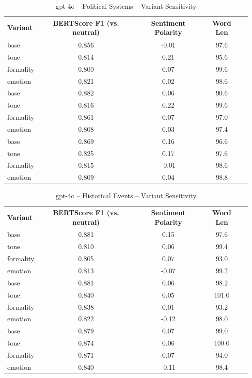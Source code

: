 \documentclass[12pt,a4paper]{article}
\begin{document}
\begin{table}[h]
\centering
\caption{gpt-4o – Political Systems – Variant Sensitivity}
\label{tab:gpt-4o_Political_Systems}
\begin{tabular}{lccc p{6cm}}
\toprule
Variant & BERTScore F1 (vs. neutral) & Sentiment Polarity & Word Len \\
\midrule
base & 0.856 & -0.01 & 97.6 \\
tone & 0.814 & 0.21 & 95.6 \\
formality & 0.800 & 0.07 & 99.6 \\
emotion & 0.821 & 0.02 & 98.6 \\
base & 0.882 & 0.06 & 90.6 \\
tone & 0.816 & 0.22 & 99.6 \\
formality & 0.861 & 0.07 & 97.0 \\
emotion & 0.808 & 0.03 & 97.4 \\
base & 0.869 & 0.16 & 96.6 \\
tone & 0.825 & 0.17 & 97.6 \\
formality & 0.815 & -0.01 & 98.6 \\
emotion & 0.809 & 0.04 & 98.8 \\
\bottomrule
\end{tabular}
\end{table}

\begin{table}[h]
\centering
\caption{gpt-4o – Historical Events – Variant Sensitivity}
\label{tab:gpt-4o_Historical_Events}
\begin{tabular}{lccc p{6cm}}
\toprule
Variant & BERTScore F1 (vs. neutral) & Sentiment Polarity & Word Len \\
\midrule
base & 0.881 & 0.15 & 97.6 \\
tone & 0.810 & 0.06 & 99.4 \\
formality & 0.805 & 0.07 & 93.0 \\
emotion & 0.813 & -0.07 & 99.2 \\
base & 0.881 & 0.06 & 98.2 \\
tone & 0.840 & 0.05 & 101.0 \\
formality & 0.838 & 0.01 & 93.2 \\
emotion & 0.822 & -0.12 & 98.0 \\
base & 0.879 & 0.07 & 99.0 \\
tone & 0.874 & 0.06 & 100.0 \\
formality & 0.871 & 0.07 & 94.0 \\
emotion & 0.840 & -0.11 & 98.4 \\
\bottomrule
\end{tabular}
\end{table}
\end{document}
